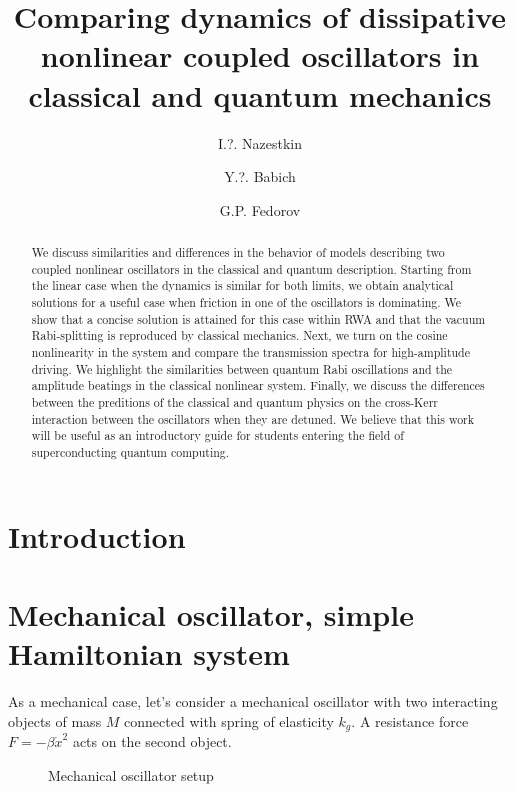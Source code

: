 \documentclass[%
aps, pra,
amsmath,amssymb,
reprint,%
superscriptaddress
]{revtex4-2}
\begin{document}
\title{Comparing dynamics of dissipative nonlinear coupled oscillators in classical and quantum mechanics}
\author{I.?. Nazestkin}
%
\author{Y.?. Babich}
\author{G.P. Fedorov}
%

\begin{abstract}
We discuss similarities and differences in the behavior of models describing two coupled nonlinear oscillators in the classical and quantum description. Starting from the linear case when the dynamics is similar for both limits, we obtain analytical solutions for a useful case when friction in one of the oscillators is dominating. We show that a concise solution is attained for this case within RWA and that the vacuum Rabi-splitting is reproduced by classical mechanics. Next, we turn on the cosine nonlinearity in the system and compare the transmission spectra for high-amplitude driving. We highlight the similarities between quantum Rabi oscillations and the amplitude beatings in the classical nonlinear system. Finally, we discuss the differences between the preditions of the classical and quantum physics on the cross-Kerr interaction between the oscillators when they are detuned. We believe that this work will be useful as an introductory guide for students entering the field of superconducting quantum computing.
\end{abstract}

\maketitle

\section{Introduction}

\section{Mechanical oscillator, simple Hamiltonian system}

As a mechanical case, let's consider a mechanical oscillator with two interacting objects of mass $M$ connected with spring of elasticity $k_g$. A resistance force $F = -\beta {\dot x}^2 $ acts on the second object.
\begin{figure}[h]
	\centering
	 \caption{Mechanical oscillator setup}
\end{figure}\newline
\end{document}
